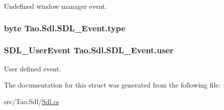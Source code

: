 Undefined window manager event. 

\hypertarget{struct_tao_1_1_sdl_1_1_s_d_l___event_a6061c378c3dc12067237f777c8504cb3}{
\subsubsection[{type}]{\setlength{\rightskip}{0pt plus 5cm}byte {\bf Tao.Sdl.SDL\_\-Event.type}}}
\label{struct_tao_1_1_sdl_1_1_s_d_l___event_a6061c378c3dc12067237f777c8504cb3}
\hypertarget{struct_tao_1_1_sdl_1_1_s_d_l___event_a27264207ca37b28d89b2b82af49108f1}{
\subsubsection[{user}]{\setlength{\rightskip}{0pt plus 5cm}SDL\_\-UserEvent {\bf Tao.Sdl.SDL\_\-Event.user}}}
\label{struct_tao_1_1_sdl_1_1_s_d_l___event_a27264207ca37b28d89b2b82af49108f1}


User defined event. 



The documentation for this struct was generated from the following file:\begin{DoxyCompactItemize}
\item 
src/Tao.Sdl/\hyperlink{_sdl_8cs}{Sdl.cs}\end{DoxyCompactItemize}
